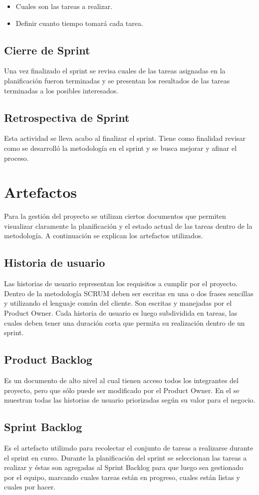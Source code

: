 \begin{itemize}
  \item Cuales son las tareas a realizar.
  \item Definir cuanto tiempo tomará cada tarea.
\end{itemize}

\subsection{Cierre de Sprint}
Una vez finalizado el sprint se revisa cuales de las tareas asignadas en la planificación
fueron terminadas y se presentan los resultados de las tareas terminadas a los posibles
interesados.

\subsection{Retrospectiva de Sprint}

Esta actividad se lleva acabo al finalizar el sprint. Tiene como finalidad revisar como
se desarrolló la metodología en el sprint y se busca mejorar y afinar el proceso.

\section{Artefactos}

Para la gestión del proyecto se utilizan ciertos documentos que permiten visualizar
claramente la planificación y el estado actual de las tareas dentro de la metodología.
A continuación se explican los artefactos utilizados.

\subsection{Historia de usuario}

Las historias de usuario representan los requisitos a cumplir por el proyecto. Dentro
de la metodología SCRUM deben ser escritas en una o dos frases sencillas y utilizando
el lenguaje común del cliente. Son escritas y manejadas por el Product Owner. Cada
historia de usuario es luego subdividida en tareas, las cuales deben tener una duración
corta que permita su realización dentro de un sprint.

\subsection{Product Backlog}

Es un documento de alto nivel al cual tienen acceso todos los integrantes del proyecto,
pero que sólo puede ser modificado por el Product Owner. En el se muestran todas las
historias de usuario priorizadas según su valor para el negocio.

\subsection{Sprint Backlog}
Es el artefacto utilizado para recolectar el conjunto de tareas a realizarse durante
el sprint en curso. Durante la planificación del sprint se seleccionan las tareas a
realizar y éstas son agregadas al Sprint Backlog para que luego sea gestionado por el
equipo, marcando cuales tareas están en progreso, cuales están listas y cuales por hacer.
